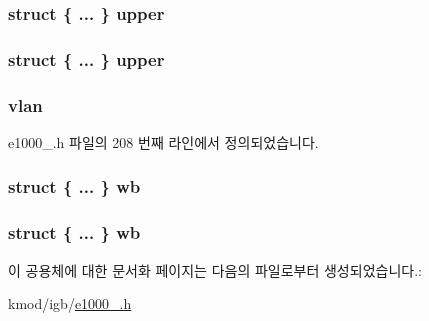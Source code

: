 \subsubsection[{\texorpdfstring{upper}{upper}}]{\setlength{\rightskip}{0pt plus 5cm}struct \{ ... \}   upper}\hypertarget{unione1000__adv__rx__desc_a5684937edd4489f4f26f63d2d1976f5e}{}\label{unione1000__adv__rx__desc_a5684937edd4489f4f26f63d2d1976f5e}
\subsubsection[{\texorpdfstring{upper}{upper}}]{\setlength{\rightskip}{0pt plus 5cm}struct \{ ... \}   upper}\hypertarget{unione1000__adv__rx__desc_a8039727b516a85c8d401e7d334c98a3b}{}\label{unione1000__adv__rx__desc_a8039727b516a85c8d401e7d334c98a3b}
\subsubsection[{\texorpdfstring{vlan}{vlan}}]{ vlan}\hypertarget{unione1000__adv__rx__desc_ae51e377f3b473a4541af0505e74399ae}{}\label{unione1000__adv__rx__desc_ae51e377f3b473a4541af0505e74399ae}


e1000\+\_.\+h 파일의 208 번째 라인에서 정의되었습니다.

\subsubsection[{\texorpdfstring{wb}{wb}}]{\setlength{\rightskip}{0pt plus 5cm}struct \{ ... \}   wb}\hypertarget{unione1000__adv__rx__desc_ae205a722536b37bd9f0eedd0e08869cf}{}\label{unione1000__adv__rx__desc_ae205a722536b37bd9f0eedd0e08869cf}
\subsubsection[{\texorpdfstring{wb}{wb}}]{\setlength{\rightskip}{0pt plus 5cm}struct \{ ... \}   wb}\hypertarget{unione1000__adv__rx__desc_a673183f8ee4467a2a46c583bfbf80557}{}\label{unione1000__adv__rx__desc_a673183f8ee4467a2a46c583bfbf80557}


이 공용체에 대한 문서화 페이지는 다음의 파일로부터 생성되었습니다.\+:\begin{DoxyCompactItemize}
\item 
kmod/igb/\hyperlink{kmod_2igb_2e1000__82575_8h}{e1000\+\_.\+h}\end{DoxyCompactItemize}
